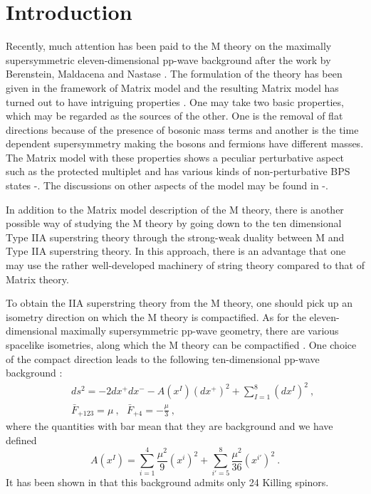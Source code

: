 \documentclass[a4paper,12pt]{article}
\numberwithin{equation}{section}
\begin{document}
\baselineskip 6.5mm
\renewcommand{\thefootnote}{\arabic{footnote}}
\setcounter{footnote}{0}

\section{Introduction}

Recently, much attention has been paid to the M theory on the
maximally supersymmetric eleven-dimensional pp-wave background after
the work by Berenstein, Maldacena and Nastase \cite{ber021}.  The
formulation of the theory has been given in the framework of Matrix
model and the resulting Matrix model has turned out to have intriguing
properties \cite{ber021,das185}.  One may take two basic properties,
which may be regarded as the sources of the other.  One is the removal
of flat directions because of the presence of bosonic mass terms and
another is the time dependent supersymmetry making the bosons and
fermions have different masses.  The Matrix model with these
properties shows a peculiar perturbative aspect such as the protected
multiplet and has various kinds of non-perturbative BPS states
\cite{das185}-\cite{par161}.  The discussions on other aspects of the
model may be found in \cite{kim061}-\cite{hyu090}.

In addition to the Matrix model description of the M theory, there is
another possible way of studying the M theory by going down to the ten
dimensional Type IIA superstring theory through the strong-weak
duality between M and Type IIA superstring theory.  In this approach,
there is an advantage that one may use the rather well-developed
machinery of string theory compared to that of Matrix theory.

To obtain the IIA superstring theory from the M theory, one should
pick up an isometry direction on which the M theory is compactified.
As for the eleven-dimensional maximally supersymmetric pp-wave
geometry, there are various spacelike isometries, along which the M
theory can be compactified \cite{mic140}.  One choice of the compact
direction leads to the following ten-dimensional pp-wave background
\cite{ben195,hyu074,sug029}:
\begin{eqnarray}
& & ds^2 = - 2 dx^+ dx^- - A(x^I) (dx^+)^2  + \sum^8_{I=1} (dx^I)^2~,
      \nonumber \\
& & \bar{F}_{+123} = \mu~,~~~ \bar{F}_{+4} = -\frac{\mu}{3}~,
\label{pp-wave}
\end{eqnarray}
where the quantities with bar mean that they are background and we have
defined
\begin{equation}
A(x^I) = \sum^4_{i=1} \frac{\mu^2}{9} (x^i)^2
            +\sum^8_{i'=5} \frac{\mu^2}{36} (x^{i'})^2~.
\end{equation}
It has been shown in \cite{ben195,hyu074} that this background admits
only 24 Killing spinors.
\end{document}
